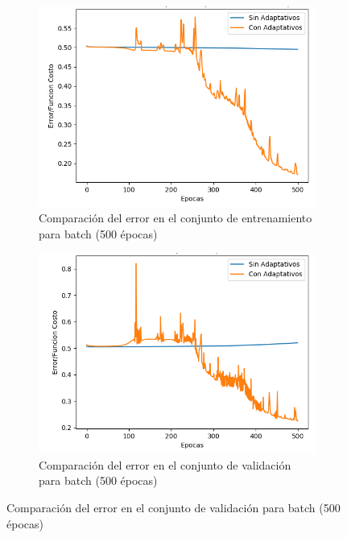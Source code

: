 \begin{figure}[!htbp]
\centering
\begin{subfigure}{.5\textwidth}
  \centering
  \includegraphics[width=1\linewidth]{graficos/adaptativos_promedios_entrenamiento_batch_500ep.png}
  \caption{Comparación del error en el conjunto de entrenamiento para batch (500 épocas)}
  \label{fig:sub1}
\end{subfigure}%
\begin{subfigure}{.5\textwidth}
  \centering
  \includegraphics[width=1\linewidth]{graficos/adaptativos_promedios_validacion_batch_500ep.png}
  \caption{Comparación del error en el conjunto de validación para batch (500 épocas)}
  \label{fig:sub2}
\end{subfigure}
\end{figure}

